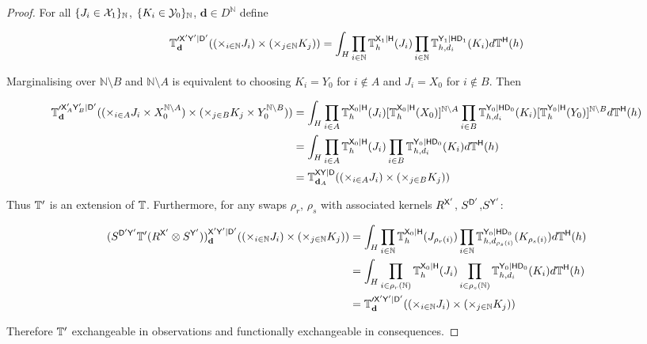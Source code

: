 \begin{proof}
For all $\{J_i\in \mathcal{X}_1\}_\mathbb{N}$, $\{K_i\in \mathcal{Y}_0\}_\mathbb{N}$, $\mathbf{d} \in D^{\mathbb{N}}$ define

\begin{align}
  \mathbb{T}^{\prime \mathsf{X}'\mathsf{Y}'|\mathsf{D}'}_{\mathbf{d}}((\times_{i\in \mathbb{N}}J_i)\times (\times_{j\in \mathbb{N}} K_j)) = \int_{H} \prod_{i\in \mathbb{N}} \mathbb{T}^{\mathsf{X}_1|\mathsf{H}}_h(J_i)\prod_{i\in \mathbb{N}}\mathbb{T}_{h,d_i}^{\mathsf{Y}_1|\mathsf{H}\mathsf{D}_1}(K_i)d\mathbb{T}^{\mathsf{H}}(h)
\end{align}

Marginalising over $\mathbb{N}\setminus B$ and $\mathbb{N}\setminus A$ is equivalent to choosing $K_i=Y_0$ for $i\not\in A$ and $J_i=X_0$ for $i\not\in B$. Then

\begin{align}
  \mathbb{T}^{\prime \mathsf{X}'_A\mathsf{Y}'_B|\mathsf{D}'}_{\mathbf{d}}((\times_{i\in A}J_i\times X_0^{\mathbb{N}\setminus A})\times (\times_{j\in B} K_j\times Y_0^{\mathbb{N}\setminus B})) &= \int_{H} \prod_{i\in A} \mathbb{T}^{\mathsf{X}_0|\mathsf{H}}_h(J_i) [\mathbb{T}^{\mathsf{X}_0|\mathsf{H}}_h (X_0)]^{\mathbb{N}\setminus A} \prod_{i\in B}\mathbb{T}_{h,d_i}^{\mathsf{Y}_0|\mathsf{H}\mathsf{D}_0}(K_i)[\mathbb{T}^{\mathsf{Y}_0|\mathsf{H}}_h (Y_0)]^{\mathbb{N}\setminus B}d\mathbb{T}^{\mathsf{H}}(h)\\
  &= \int_{H} \prod_{i\in A} \mathbb{T}^{\mathsf{X}_0|\mathsf{H}}_h(J_i) \prod_{i\in B}\mathbb{T}_{h,d_i}^{\mathsf{Y}_0|\mathsf{H}\mathsf{D}_0}(K_i)d\mathbb{T}^{\mathsf{H}}(h)\\
  &= \mathbb{T}^{\mathsf{X}\mathsf{Y}|\mathsf{D}}_{\mathbf{d}_A}((\times_{i\in A}J_i)\times (\times_{j\in B} K_j))
\end{align}

Thus $\mathbb{T}'$ is an extension of $\mathbb{T}$. Furthermore, for any swaps $\rho_r$, $\rho_s$ with associated kernels $R^{\mathsf{X}'}$, $S^{\mathsf{D}'}$,$S^{\mathsf{Y'}}$:

\begin{align}
  (S^{\mathsf{D'}\mathsf{Y'}}\mathbb{T}'(R^{\mathsf{X'}}\otimes S^{\mathsf{Y}'}))^{\mathsf{X}'\mathsf{Y}'|\mathsf{D}'}_{\mathbf{d}}((\times_{i\in \mathbb{N}}J_i)\times (\times_{j\in \mathbb{N}} K_j)) &= \int_{H} \prod_{i\in \mathbb{N}} \mathbb{T}^{\mathsf{X}_0|\mathsf{H}}_h(J_{\rho_r(i)})\prod_{i\in \mathbb{N}}\mathbb{T}_{h,d_{\rho_s(i)}}^{\mathsf{Y}_0|\mathsf{H}\mathsf{D}_0}(K_{\rho_s(i)})d\mathbb{T}^{\mathsf{H}}(h) \\
                            &= \int_{H} \prod_{i\in \rho_{r}(\mathbb{N})} \mathbb{T}^{\mathsf{X}_0|\mathsf{H}}_h(J_{i})\prod_{i\in \rho_s(\mathbb{N})}\mathbb{T}_{h,d_{i}}^{\mathsf{Y}_0|\mathsf{H}\mathsf{D}_0}(K_{i})d\mathbb{T}^{\mathsf{H}}(h) \\
                            &= \mathbb{T}^{\prime \mathsf{X}'\mathsf{Y}'|\mathsf{D}'}_{\mathbf{d}}((\times_{i\in \mathbb{N}}J_i)\times (\times_{j\in \mathbb{N}} K_j))
\end{align}

Therefore $\mathbb{T}'$ exchangeable in observations and functionally exchangeable in consequences.
\end{proof}